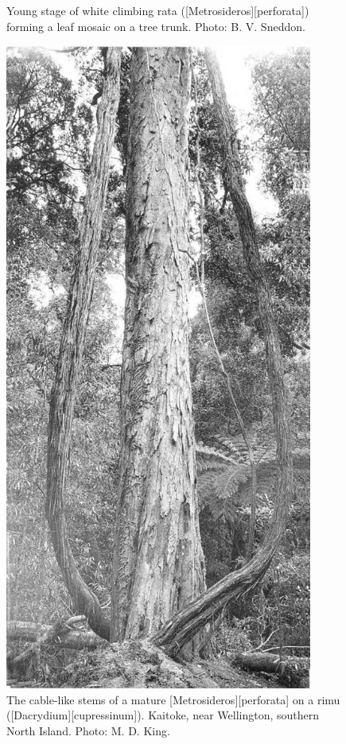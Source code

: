 \begin{figure}[!htb]
\begin{minipage}[t]{0.454\textwidth}
    	\caption[Young stage of white climbing rata]{Young stage of white climbing rata ([Metrosideros][perforata]) forming a leaf mosaic on a tree trunk. Photo: B. V. Sneddon.}%
    	\label{fig:30rata}
	\end{minipage}\hfill%
	\begin{minipage}[t]{0.526\textwidth}
    	\centering
    	\includegraphics[width=0.9\textwidth]{graphics/figure31perforata.jpg}
    	\caption[A mature \emph{Metrosideros perforata} on a rimu]{The cable-like stems of a mature [Metrosideros][perforata] on a rimu ([Dacrydium][cupressinum]). Kaitoke, near Wellington, southern North Island. Photo: M. D. King.}%
    	\label{fig:31perforata}
	\end{minipage}
\end{figure}

